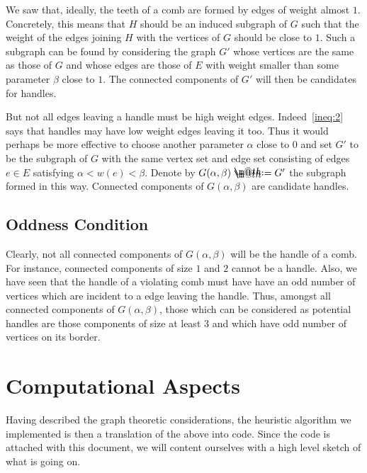 \documentclass[11pt, letterpaper]{amsart}
\makeatletter
\theoremstyle{plain}
\theoremstyle{definition}
\theoremstyle{remark}
\newcommand*{\coloneqq}{\mathrel{\rlap{%
           \raisebox{0.3ex}{$\m@th\cdot$}}%
           \raisebox{-0.3ex}{$\m@th\cdot$}}%
           =}
\makeatother
\begin{document}
We saw that, ideally, the teeth of a comb are formed by edges of weight almost
$1$. Concretely, this means that $H$ should be an induced subgraph of $G$ such
that the weight of the edges joining $H$ with the vertices of $G$ should be
close to $1$. Such a subgraph can be found by considering the graph $G'$ whose
vertices are the same as those of $G$ and whose edges are those of $E$ with
weight smaller than some parameter $\beta$ close to $1$. The connected
components of $G'$ will then be candidates for handles.

But not all edges leaving a handle must be high weight edges.
Indeed~\eqref{ineq:2} says that handles may have low weight edges leaving it
too. Thus it would perhaps be more effective to choose another parameter
$\alpha$ close to $0$ and set $G'$ to be the subgraph of $G$ with the same
vertex set and edge set consisting of edges $e \in E$ satisfying $\alpha < w(e)
< \beta$. Denote by $G(\alpha,\beta) \coloneqq G'$ the subgraph formed in this
way. Connected components of $G(\alpha,\beta)$ are candidate handles.

\subsection{Oddness Condition}
Clearly, not all connected components of $G(\alpha,\beta)$ will be the handle
of a comb. For instance, connected components of size $1$ and $2$ cannot be a
handle. Also, we have seen that the handle of a violating comb must have have
an odd number of vertices which are incident to a edge leaving the handle.
Thus, amongst all connected components of $G(\alpha,\beta)$, those which can be
considered as potential handles are those components of size at least $3$ and
which have odd number of vertices on its border.

\section{Computational Aspects}
Having described the graph theoretic considerations, the heuristic algorithm we
implemented is then a translation of the above into code. Since the code is attached
with this document, we will content ourselves with a high level sketch of what is
going on.
\end{document}
